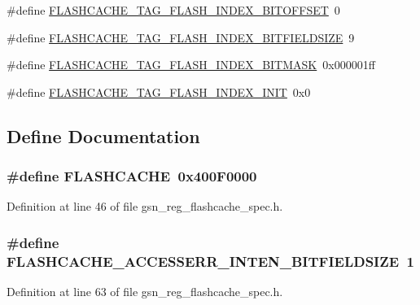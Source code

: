 \begin{DoxyCompactItemize}
\item 
\#define \hyperlink{a00550_a1559272d281c75c85033121a2f8e1ba3}{FLASHCACHE\_\-TAG\_\-FLASH\_\-INDEX\_\-BITOFFSET}~0
\item 
\#define \hyperlink{a00550_a06c869fe4a404cf3d4717cf43f427294}{FLASHCACHE\_\-TAG\_\-FLASH\_\-INDEX\_\-BITFIELDSIZE}~9
\item 
\#define \hyperlink{a00550_ae9b89d743666988c42336eb0000d65ac}{FLASHCACHE\_\-TAG\_\-FLASH\_\-INDEX\_\-BITMASK}~0x000001ff
\item 
\#define \hyperlink{a00550_a012332b21098a12379d3da0275e74b69}{FLASHCACHE\_\-TAG\_\-FLASH\_\-INDEX\_\-INIT}~0x0
\end{DoxyCompactItemize}


\subsection{Define Documentation}
\hypertarget{a00550_a3db39f2a48f75415f90413a337967d5c}{
\subsubsection[{FLASHCACHE}]{\setlength{\rightskip}{0pt plus 5cm}\#define FLASHCACHE~0x400F0000}}
\label{a00550_a3db39f2a48f75415f90413a337967d5c}


Definition at line 46 of file gsn\_\-reg\_\-flashcache\_\-spec.h.

\hypertarget{a00550_a9569efd7d8f4c6f84fc21577a86b2330}{
\subsubsection[{FLASHCACHE\_\-ACCESSERR\_\-INTEN\_\-BITFIELDSIZE}]{\setlength{\rightskip}{0pt plus 5cm}\#define FLASHCACHE\_\-ACCESSERR\_\-INTEN\_\-BITFIELDSIZE~1}}
\label{a00550_a9569efd7d8f4c6f84fc21577a86b2330}


Definition at line 63 of file gsn\_\-reg\_\-flashcache\_\-spec.h.

